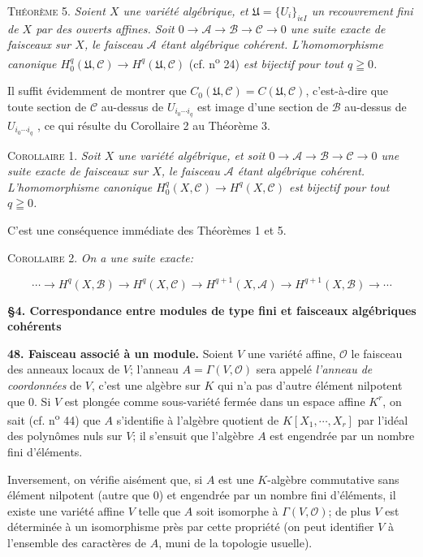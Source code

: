 \textsc{Théorème} 5. \textit{Soient $X$ une variété algébrique, et $\mathfrak{U} = \{U_i\}_{i \epsilon I}$ un recouvrement}
\textit{fini de $X$ par des ouverts affines. Soit $0 \to \mathcal{A} \to \mathcal{B} \to \mathcal{C} \to 0$ une suite exacte de faisceaux sur $X$, le faisceau $\mathcal{A}$ étant algébrique cohérent. L'homomorphisme canonique $H^q_0(\mathfrak{U}, \mathcal{C}) \to H^q(\mathfrak{U}, \mathcal{C})$} (cf. n\textsuperscript{o} 24) \textit{est bijectif pour tout $q \geqq 0$.}

Il suffit évidemment de montrer que $C_0(\mathfrak{U}, \mathcal{C}) = C(\mathfrak{U}, \mathcal{C})$, c'est-à-dire que toute section de $\mathcal{C}$ au-dessus de $U_{i_0 \cdots i_q}$ est image d'une section de $\mathcal{B}$ au-dessus de $U_{i_0 \cdots i_q}$ , ce qui résulte du Corollaire 2 au Théorème 3.

\textsc{Corollaire} 1. \textit{Soit $X$ une variété algébrique, et soit $0 \to \mathcal{A} \to \mathcal{B} \to \mathcal{C} \to 0$ une suite exacte de faisceaux sur $X$, le faisceau $\mathcal{A}$ étant algébrique cohérent. L'homomorphisme canonique $H^q_0(X, \mathcal{C}) \to H^q(X, \mathcal{C})$ est bijectif pour tout $q \geqq 0$.}

C'est une conséquence immédiate des Théorèmes 1 et 5.

\textsc{Corollaire} 2. \textit{On a une suite exacte:}

\begin{equation*}
\cdots \to H^q(X, \mathcal{B}) \to H^q(X, \mathcal{C}) \to H^{q+1}(X, \mathcal{A}) \to H^{q+1}(X, \mathcal{B}) \to \cdots
\end{equation*}

\textbf{§4. Correspondance entre modules de type fini et faisceaux algébriques cohérents}

\textbf{48. Faisceau associé à un module.} Soient $V$ une variété affine, $\mathcal{O}$ le faisceau des anneaux locaux de $V$; l'anneau $A = \Gamma(V, \mathcal{O})$ sera appelé \textit{l'anneau de coordonnées} de $V$, c'est une algèbre sur $K$ qui n'a pas d'autre élément nilpotent que 0. Si $V$ est plongée comme sous-variété fermée dans un espace affine $K^r$, on sait (cf. n\textsuperscript{o} 44) que $A$ s'identifie à l'algèbre quotient de $K[X_1 , \cdots , X_r]$ par l'idéal des polynômes nuls sur $V$; il s'ensuit que l'algèbre $A$ est engendrée par un nombre fini d'éléments.

Inversement, on vérifie aisément que, si $A$ est une $K$-algèbre commutative sans élément nilpotent (autre que 0) et engendrée par un nombre fini d'éléments, il existe une variété affine $V$ telle que $A$ soit isomorphe à $\Gamma(V, \mathcal{O})$; de plus $V$ est déterminée à un isomorphisme près par cette propriété (on peut identifier $V$ à l'ensemble des caractères de $A$, muni de la topologie usuelle).

